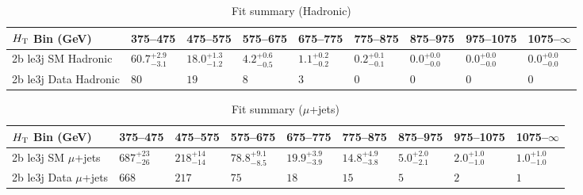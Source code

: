 \documentclass[8pt]{article}
\def\scalht{\mbox{$H_{\rm{T}}$}\xspace}
\newcommand\T{\rule{0pt}{2.6ex}}
\begin{document}
\begin{table}[ht!]
\caption{Fit summary (Hadronic)}
\label{tab:ensemble-summary}
\centering
\begin{tabular}{ lllllllll }

\hline
\scalht Bin (GeV)       & 375--475                       & 475--575                       & 575--675                       & 675--775                       & 775--875                       & 875--975                       & 975--1075                      & 1075--$\infty$                 \\ [1.000000ex]
\hline
2b le3j SM Hadronic\T   & $60.7^{+2.9}_{-3.1}$           & $18.0^{+1.3}_{-1.2}$           & $4.2^{+0.6}_{-0.5}$            & $1.1^{+0.2}_{-0.2}$            & $0.2^{+0.1}_{-0.1}$            & $0.0^{+0.0}_{-0.0}$            & $0.0^{+0.0}_{-0.0}$            & $0.0^{+0.0}_{-0.0}$            \\ 
2b le3j Data Hadronic\T & $80$                           & $19$                           & $8$                            & $3$                            & $0$                            & $0$                            & $0$                            & $0$                            \\ 
\hline

\end{tabular}
\end{table}
\begin{table}[ht!]
\caption{Fit summary ($\mu$+jets)}
\label{tab:ensemble-summary}
\centering
\begin{tabular}{ lllllllll }

\hline
\scalht Bin (GeV)       & 375--475                       & 475--575                       & 575--675                       & 675--775                       & 775--875                       & 875--975                       & 975--1075                      & 1075--$\infty$                 \\ [1.000000ex]
\hline
2b le3j SM $\mu$+jets\T & $687^{+23}_{-26}$              & $218^{+14}_{-14}$              & $78.8^{+9.1}_{-8.5}$           & $19.9^{+3.9}_{-3.9}$           & $14.8^{+4.9}_{-3.8}$           & $5.0^{+2.0}_{-2.1}$            & $2.0^{+1.0}_{-1.0}$            & $1.0^{+1.0}_{-1.0}$            \\ 
2b le3j Data $\mu$+jets\T & $668$                          & $217$                          & $75$                           & $18$                           & $15$                           & $5$                            & $2$                            & $1$                            \\ 
\hline

\end{tabular}
\end{table}
\end{document}
